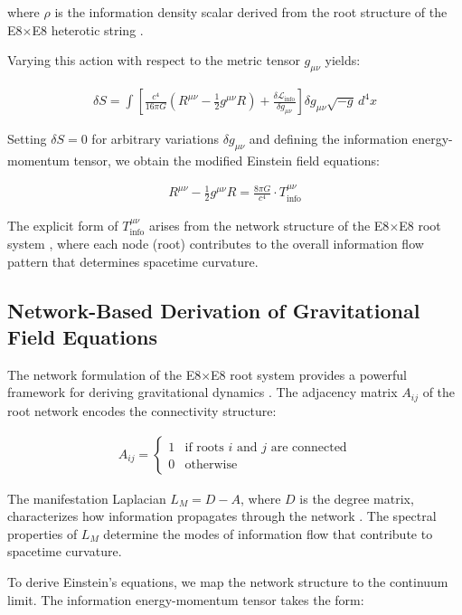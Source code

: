 \documentclass[11pt,english,twoside]{article}
\theoremstyle{plain}
\theoremstyle{definition}
\theoremstyle{remark}
\begin{document}
where $\rho$ is the information density scalar derived from the root structure of the E8$\times$E8 heterotic string \cite{Harlow2016}.

Varying this action with respect to the metric tensor $g_{\mu\nu}$ yields:

\begin{align}
\delta S = \int \left[\frac{c^4}{16\pi G}(R^{\mu\nu} - \frac{1}{2}g^{\mu\nu}R) + \frac{\delta \mathcal{L}_{\text{info}}}{\delta g_{\mu\nu}}\right] \delta g_{\mu\nu} \sqrt{-g} \, d^4x
\end{align}

Setting $\delta S = 0$ for arbitrary variations $\delta g_{\mu\nu}$ and defining the information energy-momentum tensor, we obtain the modified Einstein field equations:

\begin{align}
R^{\mu\nu} - \frac{1}{2}g^{\mu\nu}R = \frac{8\pi G}{c^4} \cdot T^{\mu\nu}_{\text{info}}
\end{align}

The explicit form of $T^{\mu\nu}_{\text{info}}$ arises from the network structure of the E8$\times$E8 root system \cite{Barabasi2016}, where each node (root) contributes to the overall information flow pattern that determines spacetime curvature.

\subsection{Network-Based Derivation of Gravitational Field Equations}

The network formulation of the E8$\times$E8 root system provides a powerful framework for deriving gravitational dynamics \cite{Strogatz2001}. The adjacency matrix $A_{ij}$ of the root network encodes the connectivity structure:

\begin{align}
A_{ij} = \begin{cases}
1 & \text{if roots $i$ and $j$ are connected}\\
0 & \text{otherwise}
\end{cases}
\end{align}

The manifestation Laplacian $L_M = D - A$, where $D$ is the degree matrix, characterizes how information propagates through the network \cite{Newman2010}. The spectral properties of $L_M$ determine the modes of information flow that contribute to spacetime curvature.

To derive Einstein's equations, we map the network structure to the continuum limit. The information energy-momentum tensor takes the form:
\end{document}
